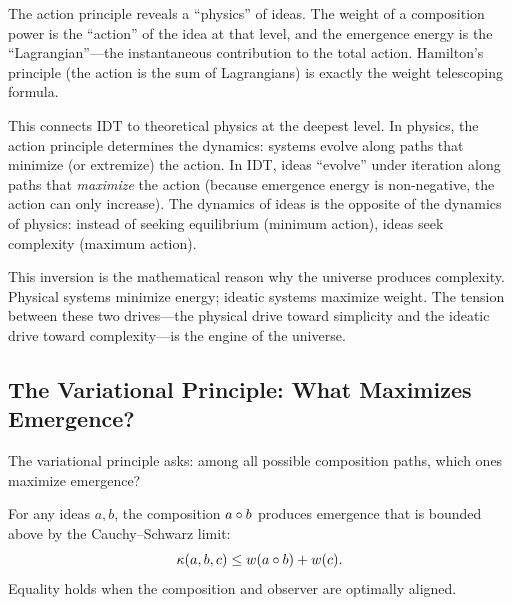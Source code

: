 \begin{interpretation}
The action principle reveals a ``physics'' of ideas. The weight of a composition
power is the ``action'' of the idea at that level, and the emergence energy is
the ``Lagrangian''---the instantaneous contribution to the total action. Hamilton's
principle (the action is the sum of Lagrangians) is exactly the weight telescoping
formula.

This connects IDT to theoretical physics at the deepest level. In physics,
the action principle determines the dynamics: systems evolve along paths that
minimize (or extremize) the action. In IDT, ideas ``evolve'' under iteration
along paths that \emph{maximize} the action (because emergence energy is
non-negative, the action can only increase). The dynamics of ideas is the
opposite of the dynamics of physics: instead of seeking equilibrium (minimum
action), ideas seek complexity (maximum action).

This inversion is the mathematical reason why the universe produces complexity.
Physical systems minimize energy; ideatic systems maximize weight. The tension
between these two drives---the physical drive toward simplicity and the ideatic
drive toward complexity---is the engine of the universe.
\end{interpretation}

\subsection{The Variational Principle: What Maximizes Emergence?}

The variational principle asks: among all possible composition paths, which
ones maximize emergence?

\begin{theorem}
\label{thm:emergence-max}
For any ideas $a, b$, the composition $a \circ b$ produces emergence that
is bounded above by the Cauchy--Schwarz limit:
\[
  \kappa(a, b, c) \leq w(a \circ b) + w(c).
\]
Equality holds when the composition and observer are optimally aligned.
\end{theorem}

